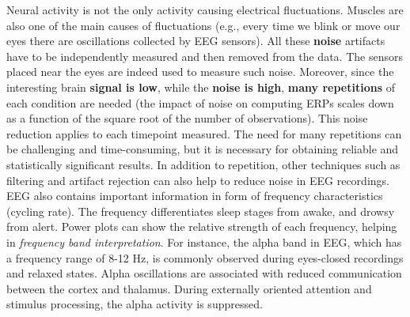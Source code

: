 
Neural activity is not the only activity causing electrical fluctuations. Muscles are also one of the main causes of fluctuations (e.g., every time we blink or move our eyes there are oscillations collected by EEG sensors). All these \textbf{noise} artifacts have to be independently measured and then removed from the data. The sensors placed near the eyes are indeed used to measure such noise.
Moreover, since the interesting brain \textbf{signal is low}, while the \textbf{noise is high}, \textbf{many repetitions} of each condition are needed (the impact of noise on computing ERPs scales down as a function of the square root of the number of observations). This noise reduction applies to each timepoint measured. 
The need for many repetitions can be challenging and time-consuming, but it is necessary for obtaining reliable and statistically significant results. In addition to repetition, other techniques such as filtering and artifact rejection can also help to reduce noise in EEG recordings.\\

EEG also contains important information in form of frequency characteristics (cycling rate). The frequency differentiates sleep stages from awake, and drowsy from alert.
Power plots can show the relative strength of each frequency, helping in \textit{frequency band interpretation}. For instance, the alpha band in EEG, which has a frequency range of 8-12 Hz, is commonly observed during eyes-closed recordings and relaxed states. Alpha oscillations are associated with reduced communication between the cortex and thalamus. During externally oriented attention and stimulus processing, the alpha activity is suppressed.


